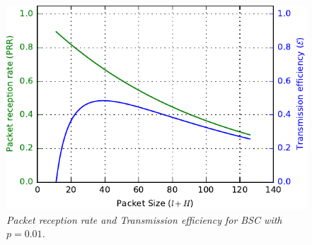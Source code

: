 \begin{figure}
\centering
\includegraphics[scale=1]{figs/simFig_BSC001.pdf} 
\caption{\textit{Packet reception rate and Transmission efficiency for BSC with $p=0.01$.}\label{fig:BSC}}
\end{figure}